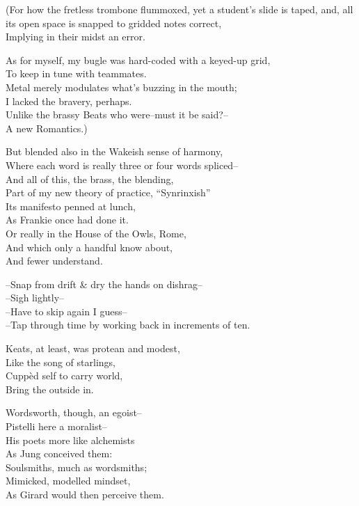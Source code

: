 (For how the fretless trombone flummoxed, yet a student's slide is taped, and, all its open space is snapped to gridded notes correct, \\
Implying in their midst an error.

As for myself, my bugle was hard-coded with a keyed-up grid, \\
To keep in tune with teammates. \\
Metal merely modulates what's buzzing in the mouth; \\
I lacked the bravery, perhaps. \\
Unlike the brassy Beats who were--must it be said?-- \\
A new Romantics.)

But blended also in the Wakeish sense of harmony, \\
Where each word is really three or four words spliced-- \\
And all of this, the brass, the blending, \\
Part of my new theory of practice, ``Synrinxish'' \\
Its manifesto penned at lunch, \\
As Frankie once had done it. \\
Or really in the House of the Owls, Rome, \\
And which only a handful know about, \\
And fewer understand.

\secdiv

--Snap from drift \& dry the hands on dishrag-- \\
--Sigh lightly-- \\
--Have to skip again I guess-- \\
--Tap through time by working back in increments of ten. 

Keats, at least, was protean and modest, \\
Like the song of starlings, \\
Cuppèd self to carry world, \\
Bring the outside in.

Wordsworth, though, an egoist-- \\
Pistelli here a moralist-- \\
His poets more like alchemists \\
As Jung conceived them: \\
Soulsmiths, much as wordsmiths; \\
Mimicked, modelled mindset, \\
As Girard would then perceive them.

